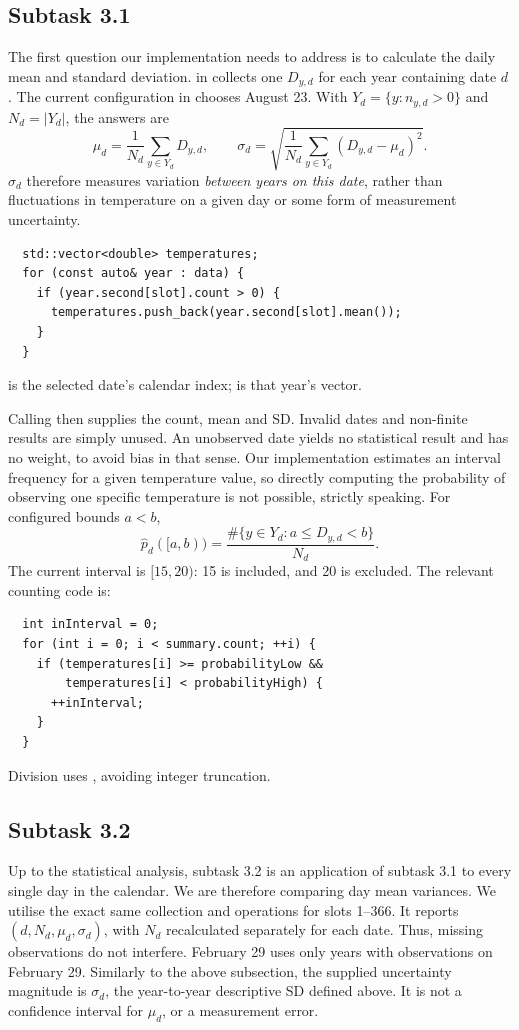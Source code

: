 \subsection{Subtask 3.1}
The first question our implementation needs to address is to calculate the daily mean and standard deviation.  in  collects one $D_{y,d}$ for each
year containing date $d$. The current configuration in  chooses
August 23. With $Y_d=\{y:n_{y,d}>0\}$ and $N_d=|Y_d|$, the answers are
\[
 \mu_d=\frac{1}{N_d}\sum_{y\in Y_d}D_{y,d},\qquad
 \sigma_d=\sqrt{\frac{1}{N_d}\sum_{y\in Y_d}(D_{y,d}-\mu_d)^2}.
\]
$\sigma_d$ therefore measures variation \emph{between years on this date}, rather
than fluctuations in temperature on a given day or some form of measurement uncertainty.
\begin{lstlisting}
  std::vector<double> temperatures;
  for (const auto& year : data) {
    if (year.second[slot].count > 0) {
      temperatures.push_back(year.second[slot].mean());
    }
  }
\end{lstlisting}
 is the selected date's calendar index;  is that year's vector. 

Calling  then supplies the count, mean and SD. Invalid dates and non-finite results are simply unused. An unobserved date yields no statistical result and has no weight, to avoid bias in that sense.
Our implementation estimates an interval frequency for a given temperature value, so directly computing the probability of observing one specific temperature is not possible, strictly speaking. For configured bounds $a<b$,
\[
 \widehat p_d([a,b))=
 \frac{\#\{y\in Y_d:a\leq D_{y,d}<b\}}{N_d}.
\]
The current interval is $[15,20)$: 15 is included, and 20 is excluded.
The relevant counting code is:
\begin{lstlisting}
  int inInterval = 0;
  for (int i = 0; i < summary.count; ++i) {
    if (temperatures[i] >= probabilityLow &&
        temperatures[i] < probabilityHigh) {
      ++inInterval;
    }
  }
  \end{lstlisting}
Division uses , avoiding
integer truncation.


\subsection{Subtask 3.2}
Up to the statistical analysis, subtask 3.2 is an application of subtask 3.1 to every single day in the calendar. We are therefore comparing day mean variances. We utilise the exact same collection and  operations for slots 1--366. It reports
$(d,N_d,\mu_d,\sigma_d)$, with $N_d$ recalculated separately for each date.
Thus, missing observations do not interfere. February 29 uses only years with observations on February 29. Similarly to the above subsection, the supplied uncertainty magnitude is $\sigma_d$, the year-to-year descriptive
SD defined above. It is not a confidence interval for $\mu_d$, or a measurement error.

